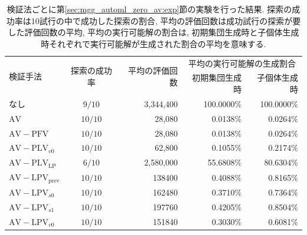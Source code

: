 \documentclass[11pt,oneside,openany,report]{jsbook}
\begin{document}
\begin{table}[tbp]
  \caption{検証法ごとに第\ref{sec:mgg_automl_zero_av:exp}節の実験を行った結果. 探索の成功率は10試行の中で成功した探索の割合, 平均の評価回数は成功試行の探索が要した評価回数の平均, 平均の実行可能解の割合は, 初期集団生成時と子個体生成時それぞれで実行可能解が生成された割合の平均を意味する. }
  \label{table:av-x}
  \centering
  \begin{tabular}{|l|cr|rr|}
    \hline
    \multirow{2}{*}{検証手法}                    & \multirow{2}{*}{探索の成功率}            & \multirow{2}{*}{平均の評価回数}
                                             & \multicolumn{2}{c|}{平均の実行可能解の生成割合}                                                      \\
                                             &                                    &                          & 初期集団生成時    & 子個体生成時     \\
    \hline \hline
    なし                                       & $9/10$                             & 3,344,400                & 100.0000\% & 100.0000\% \\
    $\mathrm{AV}$                            & $10/10$                            & 28,080                   & 0.0138\%   & 0.0264\%   \\
    \hline
    $\mathrm{AV}-\mathrm{PFV}$               & $10/10$                            & 28,080                   & 0.0138\%   & 0.0264\%   \\
    $\mathrm{AV}-\mathrm{PLV}_{v0}$          & $10/10$                            & 62,800                   & 0.1055\%   & 0.2174\%   \\
    $\mathrm{AV}-\mathrm{PLV}_\mathrm{LP}$   & $6/10$                             & 2,580,000                & 55.6808\%  & 80.6304\%  \\
    $\mathrm{AV}-\mathrm{LPV}_\mathrm{prev}$ & $10/10$                            & 138400                   & 0.4088\%   & 0.8165\%   \\
    $\mathrm{AV}-\mathrm{LPV}_{s0}$          & $10/10$                            & 162480                   & 0.3710\%   & 0.7364\%   \\
    $\mathrm{AV}-\mathrm{LPV}_{s1}$          & $10/10$                            & 197760                   & 0.4205\%   & 0.8504\%   \\
    $\mathrm{AV}-\mathrm{LPV}_{v0}$          & $10/10$                            & 151840                   & 0.3030\%   & 0.6081\%   \\
    \hline
  \end{tabular}
\end{table}
\end{document}
